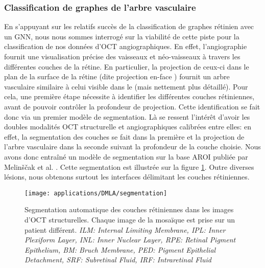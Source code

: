 \subsubsection{Classification de graphes de l'arbre vasculaire}
En s'appuyant sur les relatifs succès de la classification de graphes rétinien avec un GNN, nous nous sommes interrogé sur la viabilité de cette piste pour la classification de nos données d'OCT angiographiques. En effet, l'angiographie fournit une visualisation précise des vaisseaux et néo-vaisseaux à travers les différentes couches de la rétine. En particulier, la projection de ceux-ci dans le plan de la surface de la rétine (dite projection \og en-face \fg) fournit un arbre vasculaire similaire à celui visible dans le \fundus{} (mais nettement plus détaillé). Pour cela, une première étape nécessite à identifier les différentes couches rétiniennes, avant de pouvoir contrôler la profondeur de projection. Cette identification se fait donc via un premier modèle de segmentation. Là se ressent l'intérêt d'avoir les doubles modalités OCT structurelle et angiographiques calibrées entre elles: en effet, la segmentation des couches se fait dans la première et la projection de l'arbre vasculaire dans la seconde suivant la profondeur de la couche choisie. Nous avons donc entraîné un modèle de segmentation sur la base AROI publiée par Melinščak et al. \cite{melinscakAnnotatedRetinalOptical2021}. Cette segmentation est illustrée sur la figure \ref{fig:SegmentationAROI}. Outre diverses lésions, nous obtenons surtout les interfaces délimitant les couches rétiniennes.
\begin{figure}[!ht]
	\centering
	\texttt{[image: applications/DMLA/segmentation]}
	\caption{Segmentation automatique des couches rétiniennes dans les images d'OCT structurelles. Chaque image de la mosaïque est prise sur un patient différent. \textit{ILM: Internal Limiting Membrane, IPL: Inner Plexiform Layer, INL: Inner Nuclear Layer, RPE: Retinal Pigment Epithelium, BM: Bruch Membrane, PED: Pigment Epithelial Detachment, SRF: Subretinal Fluid, IRF: Intraretinal Fluid}}
	\label{fig:SegmentationAROI}
\end{figure}
 
